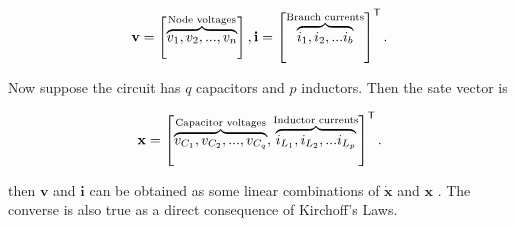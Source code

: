 \begin{equation} \mathbf{v} = \left[ \overbrace{v_1,v_2,...,v_n}^{\text{Node voltages}}\right],\mathbf{i} = \left[ \overbrace{i_1, i_2 , ... i_b}^{\text{Branch currents}}\right]^{\mathsf{T}} .\end{equation}

	Now suppose the circuit has $q$ capacitors and $p$ inductors. Then the sate vector is

\begin{equation} \mathbf{x} = \left[ \overbrace{v_{C_1},v_{C_2},...,v_{C_q}}^{\text{Capacitor voltages}}, \overbrace{i_{L_1}, i_{L_2} , ... i_{L_p}}^{\text{Inductor currents}}\right]^{\mathsf{T}} .\end{equation}

	\noindent then $\mathbf{v}$ and $\mathbf{i}$ can be obtained as some linear combinations of $\dot{\mathbf{x}}$ and $\mathbf{x}$ . The converse is also true as a direct consequence of Kirchoff's Laws.

%
%	



